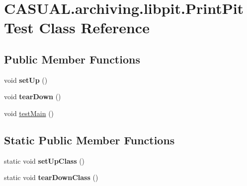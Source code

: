 \hypertarget{classCASUAL_1_1archiving_1_1libpit_1_1PrintPitTest}{\section{C\-A\-S\-U\-A\-L.\-archiving.\-libpit.\-Print\-Pit\-Test Class Reference}
\label{classCASUAL_1_1archiving_1_1libpit_1_1PrintPitTest}
}
\subsection*{Public Member Functions}
\begin{DoxyCompactItemize}
\item 
\hypertarget{classCASUAL_1_1archiving_1_1libpit_1_1PrintPitTest_a005bbb9630e8f2235fb1e5305981763e}{void {\bfseries set\-Up} ()}\label{classCASUAL_1_1archiving_1_1libpit_1_1PrintPitTest_a005bbb9630e8f2235fb1e5305981763e}

\item 
\hypertarget{classCASUAL_1_1archiving_1_1libpit_1_1PrintPitTest_abca9206e3105cba2dff9e2166e20b797}{void {\bfseries tear\-Down} ()}\label{classCASUAL_1_1archiving_1_1libpit_1_1PrintPitTest_abca9206e3105cba2dff9e2166e20b797}

\item 
void \hyperlink{classCASUAL_1_1archiving_1_1libpit_1_1PrintPitTest_a8cda7943146d8bcd23cef645058a5ab0}{test\-Main} ()
\end{DoxyCompactItemize}
\subsection*{Static Public Member Functions}
\begin{DoxyCompactItemize}
\item 
\hypertarget{classCASUAL_1_1archiving_1_1libpit_1_1PrintPitTest_a5b223af9f63aa53afab25f0503aa3125}{static void {\bfseries set\-Up\-Class} ()}\label{classCASUAL_1_1archiving_1_1libpit_1_1PrintPitTest_a5b223af9f63aa53afab25f0503aa3125}

\item 
\hypertarget{classCASUAL_1_1archiving_1_1libpit_1_1PrintPitTest_a35965daf3bd2a0a1f076f0c236425a74}{static void {\bfseries tear\-Down\-Class} ()}\label{classCASUAL_1_1archiving_1_1libpit_1_1PrintPitTest_a35965daf3bd2a0a1f076f0c236425a74}

\end{DoxyCompactItemize}


